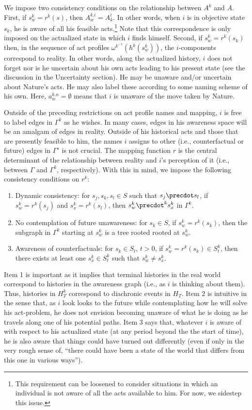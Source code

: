 \documentclass[
11pt,
titlepage,
reqno,
]{article}%
\theoremstyle{definition}
\begin{document}
We impose two consistency conditions on the relationship between $A^k$ and $A$.
First,  if $s^k_w=r^k(s)$, then $A^{k.i}_{w}= A^i_k$.
In other words, when $i$ is in objective state $s_k$, he is aware of all his feasible acts.\footnote
{
	This requirement can be loosened to consider situations in which an individual is not aware of all the acts available to him. For now, we sidestep this issue.
}
Note that this correspondence is only imposed on the actualized state in which $i$ finds himself.
Second, if $s^k_w=r^k(s_k)$ then, in the sequence of act profiles $\omega^{k^{-1}}(h^k(s^k_w))$, the $i$-components correspond to reality.
In other words, along the actualized history, $i$  does not forget nor is he uncertain about his own acts leading to his present state (see the discussion in the Uncertainty section).
He may be unaware and/or uncertain about Nature's acts.
He may also label these according to some naming scheme of his own.
Here, $a^{k.n}_{w}=\emptyset$ means that $i$ is unaware of the move taken by Nature.

Outside of the preceding restrictions on act profile names and mapping, $i$ is free to label edges in $\Gamma^k$ as he wishes.
In many cases, edges in his awareness space will be an amalgam of edges in reality. 
Outside of his historical acts and those that are presently feasible to him, the names $i$ assigns to other (i.e., counterfactual or future)  edges in $\Gamma^s$ is not crucial.
The mapping function $r$ is the central determinant of the relationship between reality and $i$'s perception of it (i.e., between  $\Gamma$ and $\Gamma^k$, respectively). 
With this in mind, we impose the following consistency conditions on $r^k$:
\begin{enumerate}
	\item Dynamic consistency: for $s_j,s_k,s_l\in S$ such that $s_j\precdot s_l $, if $s^k_w=r^k(s_j)$ and $s^k_x=r^k(s_l)$, then $s^k_w\precdot^k s^k_x$ in $\Gamma^k$.
	\item No contemplation of future unawareness: for $s_k\in S$, if $s^k_w=r^k(s_k)$, then the subgraph in $\Gamma^k$ starting at $s^k_w$ is a tree rooted rooted at $s^k_w$.
	\item Awareness of counterfactuals:  for $s_k\in S_t$, $t>0$, if $s^k_w=r^k(s_k)\in S^k_t$, then there exists at least one $s^k_x\in S^k_t$ such that  $s^k_w\ne s^k_x$.
\end{enumerate}
Item 1 is important as it implies that terminal histories in the real world correspond to histories in the awareness graph (i.e., as $i$ is thinking about them).
Thus, histories in $H^k_T$ correspond to diachronic events in $H_T$.
Item 2 is intuitive in the sense that, as $i$ look looks to the future while contemplating how he will solve his  act-problem, he does not envision becoming unaware of what he is doing as he travels along one of his potential paths.
Item 3 says that, whatever $i$ is aware of with respect to his actualized state (at any period beyond the the start of time), he is also aware that things could have turned out differently (even if only in the very rough sense of, ``there could have been a state of the world that differs from this one in various ways'').
\end{document}
